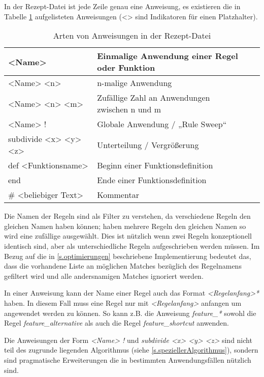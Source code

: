 In der Rezept-Datei ist jede Zeile genau eine Anweisung, es existieren die in Tabelle \ref{t.anweisungen} aufgelisteten Anweisungen (<> sind Indikatoren für einen Platzhalter).

\begin{table}[h]
    \begin{tabular}{@{}llll@{}}
        \toprule
        <Name> & Einmalige Anwendung einer Regel oder Funktion \\ \midrule
        <Name> <n> & n-malige Anwendung \\ \midrule
        <Name> <n> <m> & Zufällige Zahl an Anwendungen zwischen n und m \\ \midrule
        <Name> ! & Globale Anwendung / „Rule Sweep“ \\ \midrule
        subdivide <x> <y> <z> & Unterteilung / Vergrößerung \\ \midrule
        def <Funktionsname> & Beginn einer Funktionsdefinition \\ \midrule
        end & Ende einer Funktionsdefinition \\ \midrule
        \# <beliebiger Text> & Kommentar \\ \bottomrule
    \end{tabular}
    \caption{Arten von Anweisungen in der Rezept-Datei}
    \label{t.anweisungen}
\end{table}

Die Namen der Regeln sind als Filter zu verstehen, da verschiedene Regeln den gleichen Namen haben können; haben mehrere Regeln den gleichen Namen so wird eine zufällige ausgewählt. Dies ist nützlich wenn zwei Regeln konzeptionell identisch sind, aber als unterschiedliche Regeln aufgeschrieben werden müssen. Im Bezug auf die in \ref{s.optimierungen} beschriebene Implementierung bedeutet das, dass die vorhandene Liste an möglichen Matches bezüglich des Regelnamens gefiltert wird und alle andersnamigen Matches ignoriert werden. 

In einer Anweisung kann der Name einer Regel auch das Format \textit{<Regelanfang>*} haben. In diesem Fall muss eine Regel nur mit \textit{<Regelanfang>} anfangen um angewendet werden zu können. So kann z.B. die Anweisung \textit{feature\_*} sowohl die Regel \textit{feature\_alternative} als auch die Regel \textit{feature\_shortcut} anwenden.

Die Anweisungen der Form \textit{<Name> !} und \textit{subdivide <x> <y> <z>} sind nicht teil des zugrunde liegenden Algorithmus (siehe \ref{s.speziellerAlgorithmus}), sondern sind pragmatische Erweiterungen die in bestimmten Anwendungsfällen nützlich sind.

